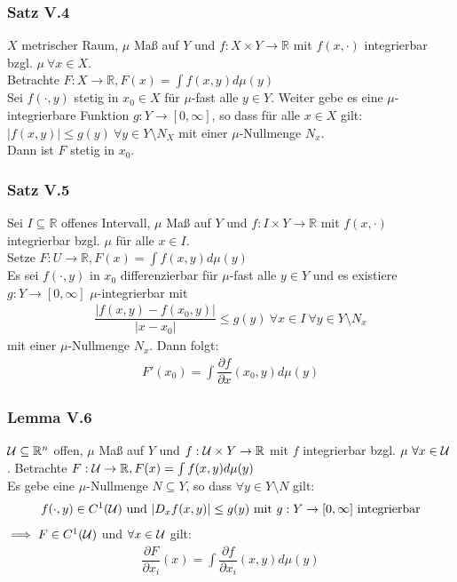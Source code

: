 \begin{frame}
\frametitle{Satz V.4}
$X$ metrischer Raum, $\mu$ Maß auf $Y$ und $f:X \times Y \to \mathbb{R}$ mit $f(x, \cdot)$ integrierbar bzgl. $\mu \ \forall x \in X$.\\
    Betrachte $F: X \to \mathbb{R}, F(x) = \int f(x,y) d\mu(y)$\\
    Sei $f(\cdot, y)$ stetig in $x_0 \in X$ für $\mu$-fast alle $y \in Y$. Weiter gebe es eine $\mu$-integrierbare Funktion $g: Y \to [0, \infty]$, so dass für alle $x \in X$ gilt: $|f(x,y)| \leq g(y) \ \forall y \in Y \setminus N_X$ mit einer $\mu$-Nullmenge $N_x$.\\
    Dann ist $F$ stetig in $x_0$.
\end{frame}


\begin{frame}
\frametitle{Satz V.5}
Sei $I \subseteq \mathbb{R}$ offenes Intervall, $\mu$ Maß auf $Y$ und $f: I \times Y \to \mathbb{R}$ mit $f(x, \cdot)$ integrierbar bzgl. $\mu$ für alle $x \in I$.\\
    Setze $F: U \to \mathbb{R}, F(x) = \int f(x,y) d\mu(y)$\\
    Es sei $f(\cdot, y)$ in $x_0$ differenzierbar für $\mu$-fast alle $y \in Y$ und es existiere $g: Y \to [0, \infty]$ $\mu$-integrierbar mit
    \begin{align*}
      \dfrac{|f(x,y) - f(x_0, y)|}{|x-x_0|} \leq g(y) \ \forall x\in I \ \forall y \in Y \setminus N_x
    \end{align*} 
    mit einer $\mu$-Nullmenge $N_x$. Dann folgt:
    \begin{align*}
      F'(x_0) = \int \dfrac{\partial f}{\partial x} (x_0, y) d\mu(y)
    \end{align*}
\end{frame}


\begin{frame}
\frametitle{Lemma V.6}
$\mathcal{U} \subseteq \mathbb{R}^n$ offen, $\mu$ Maß auf $Y$ und $f: \mathcal{U} \times Y \to \mathbb{R}$ mit $f$ integrierbar bzgl. $\mu \ \forall x \in \mathcal{U}$. Betrachte $F: \mathcal{U} \to \mathbb{R}, F(x) = \int f(x,y) d\mu(y)$\\
    Es gebe eine $\mu$-Nullmenge $N \subseteq Y$, so dass $\forall y \in Y \setminus N$ gilt:
    \begin{align*}
      f(\cdot, y) \in C^1(\mathcal{U}) \text{ und } |D_x f(x,y)| \leq g(y) \text{ mit } g: Y \to [0, \infty] \text{ integrierbar}
    \end{align*}
    $\implies F \in C^1(\mathcal{U})$ und $\forall x \in \mathcal{U}$ gilt:
    \begin{align*}
      \dfrac{\partial F}{\partial x_i}(x) = \int \dfrac{\partial f}{\partial x_i}(x,y) d\mu(y)
    \end{align*}
\end{frame}


